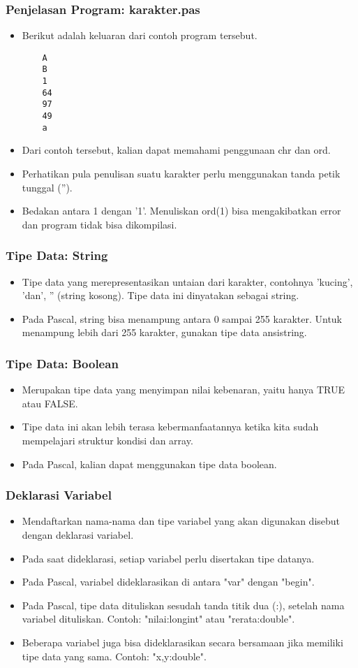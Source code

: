 \documentclass{beamer}
\begin{document}
\begin{frame}[fragile]
\frametitle{Penjelasan Program: karakter.pas}
\begin{itemize}
	\item Berikut adalah keluaran dari contoh program tersebut.
	\begin{lstlisting}
	A
	B
	1
	64
	97
	49
	a
	\end{lstlisting}
	\item Dari contoh tersebut, kalian dapat memahami penggunaan chr dan ord.
	\item Perhatikan pula penulisan suatu karakter perlu menggunakan tanda petik tunggal ('').
	\item Bedakan antara 1 dengan '1'. Menuliskan ord(1) bisa mengakibatkan error dan program tidak bisa dikompilasi.
\end{itemize}
\end{frame}

\begin{frame}
\frametitle{Tipe Data: String}
\begin{itemize}
	\item Tipe data yang merepresentasikan untaian dari karakter, contohnya 'kucing', 'dan', '' (string kosong). Tipe data ini dinyatakan sebagai \alert{string}.
	\item Pada Pascal, string bisa menampung antara 0 sampai 255 karakter. Untuk menampung lebih dari 255 karakter, gunakan tipe data \alert{ansistring}.
\end{itemize}
\end{frame}

\begin{frame}
\frametitle{Tipe Data: Boolean}
\begin{itemize}
	\item Merupakan tipe data yang menyimpan nilai kebenaran, yaitu hanya TRUE atau FALSE.
	\item Tipe data ini akan lebih terasa kebermanfaatannya ketika kita sudah mempelajari struktur kondisi dan array.
	\item Pada Pascal, kalian dapat menggunakan tipe data \alert{boolean}.
\end{itemize}
\end{frame}

\begin{frame}
\frametitle{Deklarasi Variabel}
\begin{itemize}
	\item Mendaftarkan nama-nama dan tipe variabel yang akan digunakan disebut dengan deklarasi variabel.
	\item Pada saat dideklarasi, setiap variabel perlu disertakan tipe datanya. 
	\item Pada Pascal, variabel dideklarasikan di antara "var" dengan "begin".
	\item Pada Pascal, tipe data dituliskan sesudah tanda titik dua (:), setelah nama variabel dituliskan. Contoh: "nilai:longint" atau "rerata:double".
	\item Beberapa variabel juga bisa dideklarasikan secara bersamaan jika memiliki tipe data yang sama. Contoh: "x,y:double".
\end{itemize}
\end{frame}
\end{document}
